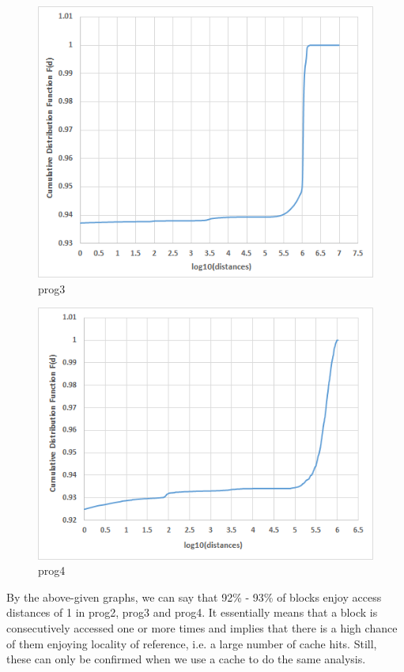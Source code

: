 \documentclass[12pt,oneside,reqno]{amsart}
\begin{document}
\bigskip
\begin{figure}[h]
    \centering
		\includegraphics[scale=1.2]{q2_prog3.png}
    	\caption{prog3}
\end{figure}
\newpage

\bigskip
\begin{figure}[h]
    \centering
		\includegraphics[scale=1.2]{q2_prog4.png}
    	\caption{prog4}
\end{figure}

\bigskip
By the above-given graphs, we can say that 92\% - 93\% of blocks enjoy access distances of 1 in prog2, prog3 and prog4. It essentially means that a block is consecutively accessed one or more times and implies that there is a high chance of them enjoying locality of reference, i.e. a large number of cache hits. Still, these can only be confirmed when we use a cache to do the same analysis. \\\\
\end{document}
